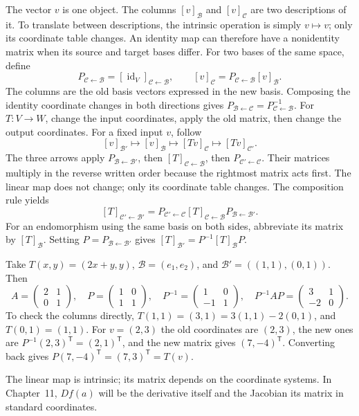 The vector $v$ is one object. The columns $[v]_{\mathcal B}$ and
$[v]_{\mathcal C}$ are two descriptions of it. To translate between
descriptions, the intrinsic operation is simply $v\mapsto v$; only its
coordinate table changes. An identity map can therefore have a
nonidentity matrix when its source and target bases differ.
For two bases of the same space, define
\[
P_{\mathcal C\leftarrow\mathcal B}
=[\operatorname{id}_V]_{\mathcal C\leftarrow\mathcal B},\qquad
[v]_{\mathcal C}=P_{\mathcal C\leftarrow\mathcal B}[v]_{\mathcal B}.
\]
The columns are the old basis vectors expressed in the new basis. Composing
the identity coordinate changes in both directions gives
$P_{\mathcal B\leftarrow\mathcal C}=P_{\mathcal C\leftarrow\mathcal B}^{-1}$.
For $T:V\to W$, change the input coordinates, apply the old matrix,
then change the output coordinates. For a fixed input $v$, follow
\[
[v]_{\mathcal B'}\longmapsto[v]_{\mathcal B}
\longmapsto[Tv]_{\mathcal C}\longmapsto[Tv]_{\mathcal C'}.
\]
The three arrows apply $P_{\mathcal B\leftarrow\mathcal B'}$, then
$[T]_{\mathcal C\leftarrow\mathcal B}$, then
$P_{\mathcal C'\leftarrow\mathcal C}$. Their matrices multiply in the
reverse written order because the rightmost matrix acts first.
The linear map does not change; only its coordinate table changes.
The composition rule yields
\[
[T]_{\mathcal C'\leftarrow\mathcal B'}=
P_{\mathcal C'\leftarrow\mathcal C}
[T]_{\mathcal C\leftarrow\mathcal B}
P_{\mathcal B\leftarrow\mathcal B'}.
\]
For an endomorphism using the same basis on both sides, abbreviate its
matrix by $[T]_{\mathcal B}$. Setting $P=P_{\mathcal B\leftarrow\mathcal B'}$
gives $[T]_{\mathcal B'}=P^{-1}[T]_{\mathcal B}P$.

\begin{example}
Take $T(x,y)=(2x+y,y)$, $\mathcal B=(e_1,e_2)$, and
$\mathcal B'=((1,1),(0,1))$. Then
\[
A=\begin{pmatrix}2&1\\0&1\end{pmatrix},\quad
P=\begin{pmatrix}1&0\\1&1\end{pmatrix},\quad
P^{-1}=\begin{pmatrix}1&0\\-1&1\end{pmatrix},\quad
P^{-1}AP=\begin{pmatrix}3&1\\-2&0\end{pmatrix}.
\]
To check the columns directly, $T(1,1)=(3,1)=3(1,1)-2(0,1)$,
and $T(0,1)=(1,1)$. For $v=(2,3)$ the old coordinates are $(2,3)$,
the new ones are $P^{-1}(2,3)^{\mathsf T}=(2,1)^{\mathsf T}$,
and the new matrix gives $(7,-4)^{\mathsf T}$. Converting back gives
$P(7,-4)^{\mathsf T}=(7,3)^{\mathsf T}=T(v)$.
\end{example}
The linear map is intrinsic; its matrix depends on the coordinate systems.
In Chapter~11, $Df(a)$ will be the derivative itself and the Jacobian its
matrix in standard coordinates.

